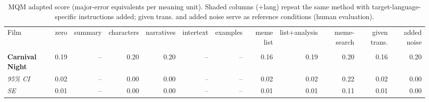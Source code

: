 \begin{table}[ht]
\centering
\begin{adjustbox}{width=\textwidth}
\begin{tabular}{lrrrrrrrrr|rr}
Film & zero & summary & characters & narratives & intertext & examples & meme list & list+analysis & meme-search & \multicolumn{1}{|r}{given trans.} & added noise \\
 &  &  &  &  &  &  &  &  &  &  &  \\
\hline
\textbf{Carnival Night} & 0.19 & -- & 0.20 & 0.20 & -- & -- & 0.16 & 0.19 & 0.20 & 0.16 & 0.20 \\

\emph{95\% CI} & 0.02 & -- & 0.00 & 0.00 & -- & -- & 0.02 & 0.02 & 0.22 & 0.02 & 0.00 \\

\emph{SE} & 0.01 & -- & 0.00 & 0.00 & -- & -- & 0.01 & 0.01 & 0.11 & 0.01 & 0.00 \\

\hline
\end{tabular}
\end{adjustbox}
\caption{MQM adapted score (major-error equivalents per meaning unit). Shaded columns (+lang) repeat the same method with target-language-specific instructions added; given trans. and added noise serve as reference conditions (human evaluation).}
\label{tab:mqm-method-comparison-human}
\end{table}
